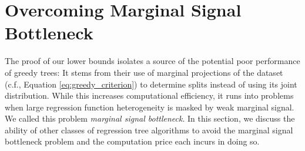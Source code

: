 \documentclass[11pt]{article}
\newtheorem{example}[theorem]{Example}
\newcommand{\bx}{\mathbf{x}}
\DeclarePairedDelimiter{\braces}{\lbrace}{\rbrace}
\DeclarePairedDelimiter{\paren}{(}{)}
\newcommand{\E}{\mathbb{E}}
\newcommand{\indicator}{\mathbb{1}}
\renewcommand{\xspace}{\mathcal{X}}
\newcommand{\ctsspace}{[0,1]^\nfeats}
\newcommand{\xmeasure}{\nu}
\newcommand{\nfeats}{d}
\newcommand{\nsamples}{n}
\newcommand{\data}[1][n]{\mathcal{D}_{#1}}
\newcommand{\frf}{\hat{f}_{\operatorname{RF}}}
\newcommand{\fcart}{\hat{f}_{\operatorname{CART}}}
\begin{document}


\section{Overcoming Marginal Signal Bottleneck}


The proof of our lower bounds isolates a source of the potential poor performance of greedy trees:
It stems from their use of marginal projections of the dataset (c.f., Equation \eqref{eq:greedy_criterion}) to determine splits instead of using its joint distribution.
While this increases computational efficiency, it runs into problems when large regression function heterogeneity is masked by weak marginal signal. 
We called this problem \emph{marginal signal bottleneck}.
In this section, we discuss the ability of other classes of regression tree algorithms to avoid the marginal signal bottleneck problem and the computation price each incurs in doing so.
\end{document}
